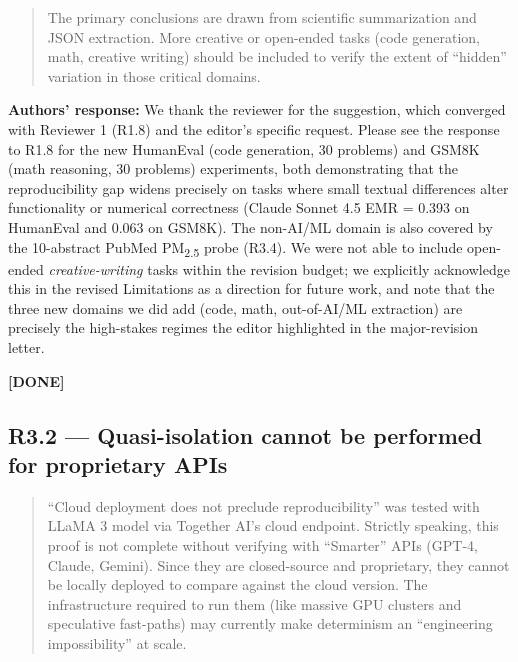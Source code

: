 \documentclass[11pt,a4paper]{article}
\newenvironment{revquote}{%
  \begin{quote}\small\itshape\color{revgray}
}{%
  \end{quote}
}
\newcommand{\response}[1]{\par\noindent\textbf{\color{revgreen}Authors' response:} #1\par}
\newcommand{\done}{\color{revgreen}\textbf{[DONE]}}
\begin{document}
\begin{revquote}
The primary conclusions are drawn from scientific summarization and JSON extraction. More creative or open-ended tasks (code generation, math, creative writing) should be included to verify the extent of ``hidden'' variation in those critical domains.
\end{revquote}

\response{We thank the reviewer for the suggestion, which converged with Reviewer 1 (R1.8) and the editor's specific request. Please see the response to R1.8 for the new HumanEval (code generation, 30 problems) and GSM8K (math reasoning, 30 problems) experiments, both demonstrating that the reproducibility gap widens precisely on tasks where small textual differences alter functionality or numerical correctness (Claude Sonnet 4.5 EMR = 0.393 on HumanEval and 0.063 on GSM8K). The non-AI/ML domain is also covered by the 10-abstract PubMed PM\textsubscript{2.5} probe (R3.4). We were not able to include open-ended \emph{creative-writing} tasks within the revision budget; we explicitly acknowledge this in the revised Limitations as a direction for future work, and note that the three new domains we did add (code, math, out-of-AI/ML extraction) are precisely the high-stakes regimes the editor highlighted in the major-revision letter.} \done

\subsection*{R3.2 --- Quasi-isolation cannot be performed for proprietary APIs}

\begin{revquote}
``Cloud deployment does not preclude reproducibility'' was tested with LLaMA 3 model via Together AI's cloud endpoint. Strictly speaking, this proof is not complete without verifying with ``Smarter'' APIs (GPT-4, Claude, Gemini). Since they are closed-source and proprietary, they cannot be locally deployed to compare against the cloud version. The infrastructure required to run them (like massive GPU clusters and speculative fast-paths) may currently make determinism an ``engineering impossibility'' at scale.
\end{revquote}
\end{document}
